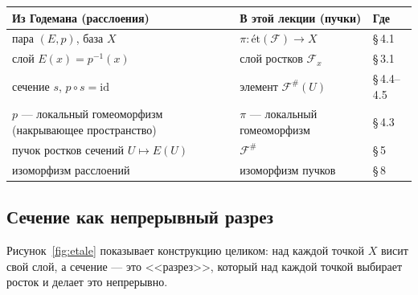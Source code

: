 \documentclass[11pt,b5paper]{article}
\newcommand{\et}{\text{ét}}
\newcommand{\id}{\mathrm{id}}
\newcommand{\Shv}[1]{\mathscr{#1}}   %
\theoremstyle{plain}
\theoremstyle{definition}
\theoremstyle{remark}
\let\brutsubsection\subsection
\renewcommand{\subsection}{\Needspace{5\baselineskip}\brutsubsection}
\begin{document}
\begin{center}
\normalsize
\setlength{\tabcolsep}{6pt}
\renewcommand{\arraystretch}{1.25}
\begin{tabular}{@{}>{\raggedright\arraybackslash}p{}
 >{\raggedright\arraybackslash}p{}
 >{\raggedright\arraybackslash}p{}@{}}
\toprule
\textbf{Из Годемана (расслоения)} &
\textbf{В этой лекции (пучки)} &
\textbf{Где} \\
\midrule
пара $(E,p)$, база $X$ & $\pi\colon\et(\Shv{F})\to X$ & \S\,4.1 \\
слой $E(x)=p^{-1}(x)$ & слой ростков $\Shv{F}_x$ & \S\,3.1 \\
сечение $s$, $p\circ s=\id$ & элемент $\Shv{F}^{\#}(U)$ &
 \S\,4.4--4.5 \\
$p$ --- локальный гомеоморфизм (накрывающее пространство) &
 $\pi$ --- локальный гомеоморфизм & \S\,4.3 \\
пучок ростков сечений $U\mapsto E(U)$ & $\Shv{F}^{\#}$ & \S\,5 \\
изоморфизм расслоений & изоморфизм пучков & \S\,8 \\
\bottomrule
\end{tabular}
\end{center}
\par\smallskip

\subsection{Сечение как непрерывный разрез}
Рисунок~\ref{fig:etale} показывает конструкцию целиком: над каждой
точкой $X$ висит свой слой, а сечение --- это <<разрез>>, который над
каждой точкой выбирает росток и делает это непрерывно.
\end{document}
